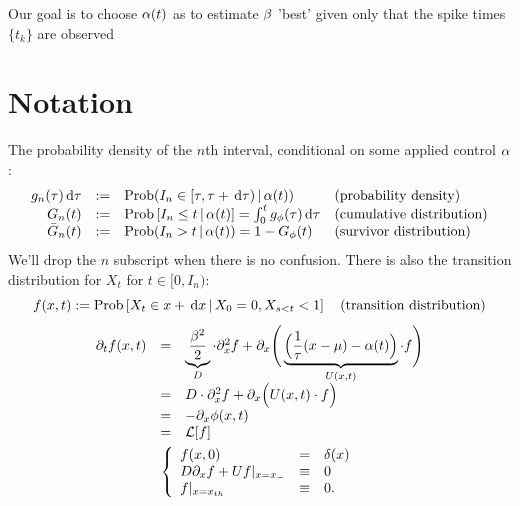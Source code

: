 \documentclass{article}
\begin{document}
Our goal is to choose ${\alpha}(t)$ as to estimate ${\beta}$ 'best' given only that the
spike times $\{t_k\}$ are observed 
 
\section{Notation}
The probability density of the $n$th interval,
conditional on some applied control ${\alpha}$:
\begin{equation} 
\begin{array}{rcll} 
g_n({\tau}) \, \mathrm{d} {\tau} &:=& \operatorname{Prob}(I_{n} \in [{\tau}, {\tau} + \, \mathrm{d} {\tau})  \,|\,
 {\alpha}(t)) &
 \textrm{(probability density)} 
\\ 
G_{n}(t) &:=& \operatorname{Prob} \left[I_{n} \leq t  \,|\,
 {\alpha}(t) \right] = \int_0^t g_{\phi}({\tau}) \, \mathrm{d} {\tau} &
 \textrm{(cumulative distribution)}
\\
{ \bar{G} }_{n}(t) &:= & \operatorname{Prob}(I_{n}>t \,|\, {\alpha}(t) ) = 1 - G_{\phi}(t)
&
 \textrm{(survivor distribution)}
\end{array}
\label{eq:ISI_distribution_functions}
\end{equation}
We'll drop the $n$ subscript when there is no confusion. 
There is also the transition distribution for $X_t$ for $t \in [0,
I_{n})$:
\begin{equation}
f(x,t) := \operatorname{Prob} \left[X_{t} \in x+ \, \mathrm{d} x  \,|\,
 X_0 = 0, X_{s < t} < 1  \right]  \quad
 \textrm{(transition distribution)}
 \label{eq:transition_distribution}
\end{equation} 
\begin{equation}
\begin{gathered}
\begin{array}{lcl}
	{\partial}_t f (x,t) &=&
					\underbrace{\frac{{\beta}^2 }{2}}_{D}\cdot {\partial}^2_x f 
					+ {\partial}_x \Bigg(  
					\underbrace{\Big( \frac 1{{ \tau }} (x-{\mu }) - {\alpha}(t) \Big)}_{U(x,t)}  \cdot  f
					\Bigg)
					\\
					&=&
					D \cdot {\partial}^2_x f +
					{\partial}_x  \Big( U(x,t) \cdot f \Big)
					\\
					&=&
					- {\partial}_x \phi(x,t)
					\\
					&=&
					{ \mathcal{L} }[f] 
					\end{array}
	\\
	\left\{ \begin{array}{lcl}
	 f (x,0) &=& \delta(x)
	\\
	D {\partial}_xf + U f |_{x={ x_{-} }} &\equiv& 0 
	\\
	f |_{x={ x_{th} }} &\equiv& 0.
	\end{array} \right.
\label{eq:FP_pde_OU_absorbBC_CDF}
\end{gathered}
\end{equation}
\end{document}
